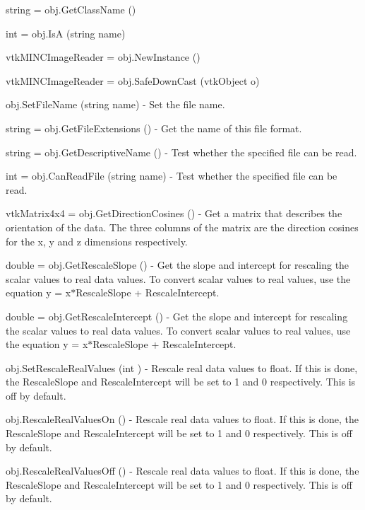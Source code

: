 \begin{DoxyItemize}
\item {\ttfamily string = obj.\-Get\-Class\-Name ()}  
\item {\ttfamily int = obj.\-Is\-A (string name)}  
\item {\ttfamily vtk\-M\-I\-N\-C\-Image\-Reader = obj.\-New\-Instance ()}  
\item {\ttfamily vtk\-M\-I\-N\-C\-Image\-Reader = obj.\-Safe\-Down\-Cast (vtk\-Object o)}  
\item {\ttfamily obj.\-Set\-File\-Name (string name)} -\/ Set the file name.  
\item {\ttfamily string = obj.\-Get\-File\-Extensions ()} -\/ Get the name of this file format.  
\item {\ttfamily string = obj.\-Get\-Descriptive\-Name ()} -\/ Test whether the specified file can be read.  
\item {\ttfamily int = obj.\-Can\-Read\-File (string name)} -\/ Test whether the specified file can be read.  
\item {\ttfamily vtk\-Matrix4x4 = obj.\-Get\-Direction\-Cosines ()} -\/ Get a matrix that describes the orientation of the data. The three columns of the matrix are the direction cosines for the x, y and z dimensions respectively.  
\item {\ttfamily double = obj.\-Get\-Rescale\-Slope ()} -\/ Get the slope and intercept for rescaling the scalar values to real data values. To convert scalar values to real values, use the equation y = x$\ast$\-Rescale\-Slope + Rescale\-Intercept.  
\item {\ttfamily double = obj.\-Get\-Rescale\-Intercept ()} -\/ Get the slope and intercept for rescaling the scalar values to real data values. To convert scalar values to real values, use the equation y = x$\ast$\-Rescale\-Slope + Rescale\-Intercept.  
\item {\ttfamily obj.\-Set\-Rescale\-Real\-Values (int )} -\/ Rescale real data values to float. If this is done, the Rescale\-Slope and Rescale\-Intercept will be set to 1 and 0 respectively. This is off by default.  
\item {\ttfamily obj.\-Rescale\-Real\-Values\-On ()} -\/ Rescale real data values to float. If this is done, the Rescale\-Slope and Rescale\-Intercept will be set to 1 and 0 respectively. This is off by default.  
\item {\ttfamily obj.\-Rescale\-Real\-Values\-Off ()} -\/ Rescale real data values to float. If this is done, the Rescale\-Slope and Rescale\-Intercept will be set to 1 and 0 respectively. This is off by default.  

\end{DoxyItemize}
